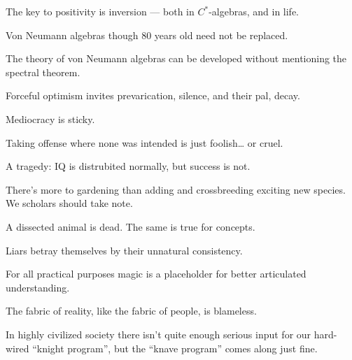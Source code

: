\documentclass[a]{subfiles}
\begin{document}
\begin{parsec}%
The key to positivity is inversion --- both in  $C^*$-algebras,
and in life.
\end{parsec}
\begin{parsec}%
Von Neumann algebras
though 80 years old
need not be replaced.
\end{parsec}
\begin{parsec}%
The theory of von Neumann algebras
can be developed without mentioning
the spectral theorem.
\end{parsec}
\begin{parsec}%
Forceful optimism
invites prevarication, silence,
and their pal, decay.
\end{parsec}
\begin{parsec}%
Mediocracy is sticky.
\end{parsec}
\begin{parsec}%
Taking offense where none was intended
is just foolish\dots{} or cruel.
\end{parsec}
\begin{parsec}%
A tragedy:
IQ is distrubited normally,
but success is not.
\end{parsec}
\begin{parsec}%
There's more to gardening
than adding and crossbreeding exciting new species.
We scholars should take note.
\end{parsec}
\begin{parsec}%
A dissected animal is dead.
The same is true for concepts.
\end{parsec}
\begin{parsec}%
Liars betray themselves by their
unnatural consistency.
\end{parsec}
\begin{parsec}%
For all practical purposes
magic is a placeholder for better
articulated understanding.
\end{parsec}
\begin{parsec}%
The fabric
of reality,
like the fabric of people,
is blameless.
\end{parsec}
\begin{parsec}%
In highly civilized society
there isn't quite enough serious input
for our hard-wired ``knight program'',
but the ``knave program'' comes along just fine.
\end{parsec}
\end{document}
